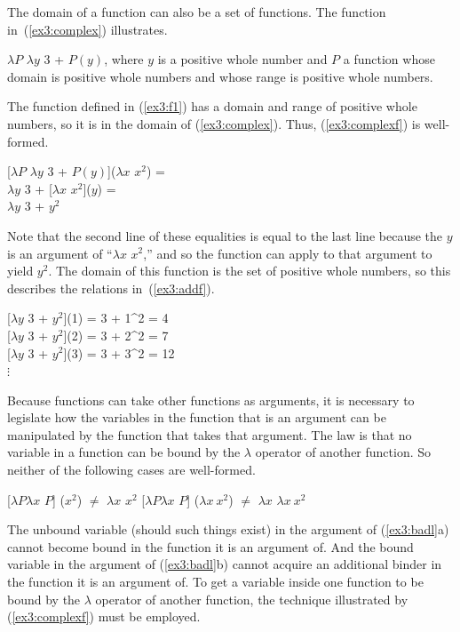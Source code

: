 The domain of a function can also be a set of functions. The function in~(\ref{ex3:complex}) illustrates.
\begin{exe}
	\raggedright
	\ex \label{ex3:complex} 
	$\lambda P$ $\lambda y$ 3 + $P(y)$, where $y$ is a positive whole number and $P$ a function whose domain is positive whole numbers and whose range is positive whole numbers.  
\end{exe}
The function defined in (\ref{ex3:f1}) has a domain and range of positive whole numbers, so it is in the domain of (\ref{ex3:complex}). Thus, (\ref{ex3:complexf}) is well-formed.
\begin{exe}
	\raggedright
	\ex \label{ex3:complexf} 
	{}[$\lambda P$ $\lambda y$ 3 + $P(y)$]($\lambda x$ $x^2$) =\\
	$\lambda y$ 3 + [$\lambda x$ $x^2$]($y$) =\\
	$\lambda y$ 3 + $y^2$
\end{exe}
Note that the second line of these equalities is equal to the last line because the $y$ is an argument of ``$\lambda x$ $x^2$,'' and so the function can apply to that argument to yield $y^2$. The domain of this function is the set of positive whole numbers, so this describes the relations in~(\ref{ex3:addf}).
\begin{exe}
	\raggedright
	\ex \label{ex3:addf} 
	{}[$\lambda y$ 3 + $y^2$](1) = 3 + 1^2 = 4\\
	{}[$\lambda y$ 3 + $y^2$](2) = 3 + 2^2 = 7\\
	{}[$\lambda y$ 3 + $y^2$](3) = 3 + 3^2 = 12\\
	\hspace*{50pt} $\vdots$
\end{exe}

\label{lambdalaw}Because functions can take other functions as arguments, it is necessary to legislate how the variables in the function that is an argument can be manipulated by the function that takes that argument. The law is that no variable in a function can be bound by the $\lambda$ operator of another function. So neither of the following cases are well-formed.
\pagebreak
\begin{exe}
	\raggedright
	\ex \label{ex3:badl} 
	\begin{xlist}
		\ex {} [$\lambda P \lambda x$ $P$] ($x^2$) $\neq$ $\lambda x$ $x^2$
		\ex {} [$\lambda P \lambda x$ $P$] ($\lambda x\ x^2$) $\neq$ $\lambda x$ $\lambda x\ x^2$
	\end{xlist}
\end{exe}
The unbound variable (should such things exist) in the argument of (\ref{ex3:badl}a) cannot become bound in the function it is an argument of. And the bound variable in the argument of (\ref{ex3:badl}b) cannot acquire an additional binder in the function it is an argument of. To get a variable inside one function to be bound by the $\lambda$ operator of another function, the technique illustrated by (\ref{ex3:complexf}) must be employed.


